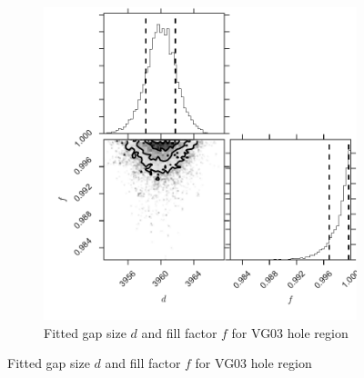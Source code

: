 \documentclass[osajnl,preprint,showpacs,superscriptaddress,12pt]{revtex4-1} %
\begin{document}


\begin{figure}[htbp]
        \centering
        \begin{subfigure}[b]{0.5\textwidth}
              \includegraphics[width=\textwidth]{figs/VG03_corner.pdf}
              \caption{Fitted gap size $d$ and fill factor $f$ for VG03 hole region}
		\label{figVG03_corner}
        \end{subfigure}


\end{figure}
\end{document}
